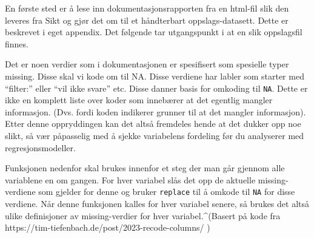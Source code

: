 \documentclass[
  letterpaper,
  DIV=11,
  numbers=noendperiod]{scrreprt}
\theoremstyle{definition}
\theoremstyle{remark}
\begin{document}
En første sted er å lese inn dokumentasjonsrapporten fra en html-fil
slik den leveres fra Sikt og gjør det om til et håndterbart
oppslags-datasett. Dette er beskrevet i eget appendix. Det følgende tar
utgangspunkt i at en slik oppslagsfil finnes.

Det er noen verdier som i dokumentasjonen er spesifisert som spesielle
typer missing. Disse skal vi kode om til NA. Disse verdiene har labler
som starter med ``filter:'' eller ``vil ikke svare'' etc. Disse danner
basis for omkoding til \texttt{NA}. Dette er ikke en komplett liste over
koder som innebærer at det egentlig mangler informasjon. (Dvs. fordi
koden indikerer grunner til at det mangler informasjon). Etter denne
oppryddingen kan det altså fremdeles hende at det dukker opp noe slikt,
så vær påpasselig med å sjekke variabelens fordeling før du analyserer
med regresjonsmodeller.

Funksjonen nedenfor skal brukes innenfor et steg der man går gjennom
alle variablene en om gangen. For hver variabel slås det opp de aktuelle
missing-verdiene som gjelder for denne og bruker \texttt{replace} til å
omkode til \texttt{NA} for disse verdiene. Når denne funksjonen kalles
for hver variabel senere, så brukes det altså ulike definisjoner av
missing-verdier for hver variabel.\^{}(Basert på kode fra
https://tim-tiefenbach.de/post/2023-recode-columns/ )
\end{document}
